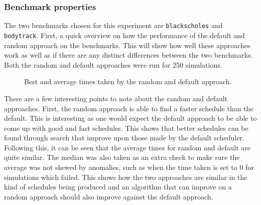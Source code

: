 \documentclass{article}
\begin{document}
\subsubsection{Benchmark properties}
The two benchmarks chosen for this experiment are \texttt{blackscholes} and \texttt{bodytrack}. First, a quick overview on how the performance of the default and random approach on the benchmarks. This will show how well these approaches work as well as if there are any distinct differences between the two benchmarks. Both the random and default approaches were run for 250 simulations. 
\begin{figure}[H]
\begin{minipage}{0.6\textwidth}
\end{minipage}
%
\begin{minipage}{0.6\textwidth}
\end{minipage}
\caption{Best and average times taken by the random and default approach.}
\end{figure}
\noindent There are a few interesting points to note about the random and default approaches. First, the random approach is able to find a faster schedule than the default. This is interesting as one would expect the default approach to be able to come up with good and fast schedules. This shows that better schedules can be found through search that improve upon those made by the default scheduler. Following this, it can be seen that the average times for random and default are quite similar. The median was also taken as an extra check to make sure the average was not skewed by anomalies, such as when the time taken is set to 0 for simulations which failed. This shows how the two approaches are similar in the kind of schedules being produced and an algorithm that can improve on a random approach should also improve against the default approach. 
\end{document}
